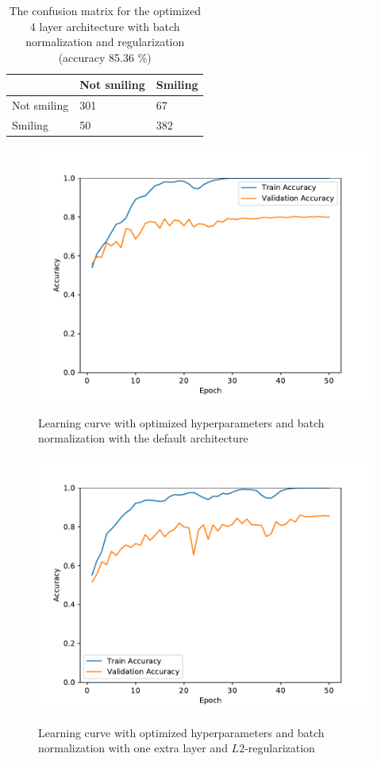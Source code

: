 \documentclass{article}
\begin{document}
\begin{table}[]
\centering
\caption{The confusion matrix for the optimized 4 layer architecture
  with batch normalization and regularization (accuracy 85.36
  \%)}\label{tab:best-confusion}
\begin{tabular}{lll}
\hline
                                 & Not smiling & Smiling \\ \hline
\multicolumn{1}{l|}{Not smiling} & 301         & 67     \\
\multicolumn{1}{l|}{Smiling}     & 50          & 382     \\ \hline
\end{tabular}
\end{table}


\begin{figure}[h]
  \centering
  \includegraphics[width=\linewidth]{figures/default_bn.pdf}\label{fig:default}
  \caption{Learning curve with optimized hyperparameters and batch
    normalization with the default architecture}
\end{figure}

\begin{figure}[h]
  \centering
  \includegraphics[width=\linewidth]{figures/best.pdf}\label{fig:best}
  \caption{Learning curve with optimized hyperparameters and batch
    normalization with one extra layer and $L2$-regularization}
\end{figure}
\end{document}
